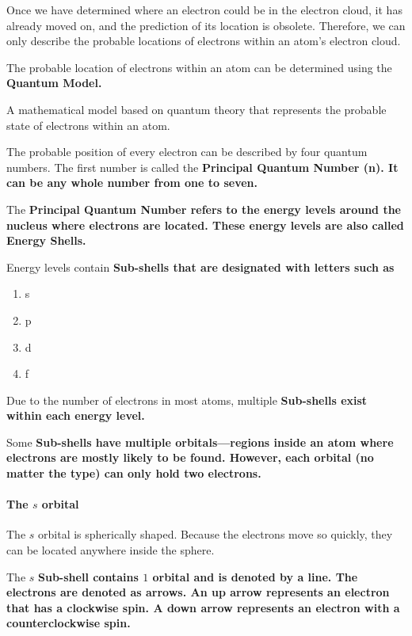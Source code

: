 
Once we have determined where an electron could be in the electron cloud, it has
already moved on, and the prediction of its location is obsolete. Therefore, we
can only describe the probable locations of electrons within an atom's electron
cloud.

The probable location of electrons within an atom can be determined using the \bf{Quantum Model}.

\begin{definition}
    A mathematical model based on quantum theory that represents the probable
    state of electrons within an atom.
\end{definition}

The probable position of every electron can be described by four quantum
numbers. The first number is called the \bf{Principal Quantum Number (n)}.
It can be any whole number from one to seven.

The \bf{Principal Quantum Number} refers to the energy levels around the nucleus
where electrons are located. These energy levels are also called \bf{Energy Shells}.

Energy levels contain \bf{Sub-shells} that are designated with letters such as

\begin{enumerate}
    \item s
    \item p
    \item d
    \item f
\end{enumerate}

Due to the number of electrons in most atoms, multiple \bf{Sub-shells} exist
within each energy level.

Some \bf{Sub-shells} have multiple orbitals—regions inside an
atom where electrons are mostly likely to be found. However, each orbital (no
matter the type) can only hold two electrons.

\paragraph{The $s$ orbital} The $s$ orbital is spherically shaped. Because the electrons move so quickly, they
can be located anywhere inside the sphere.

The $s$ \bf{Sub-shell} contains $1$ orbital and is denoted by a line. The electrons
are denoted as arrows. An up arrow represents an electron that has a clockwise
spin. A down arrow represents an electron with a counterclockwise spin.

